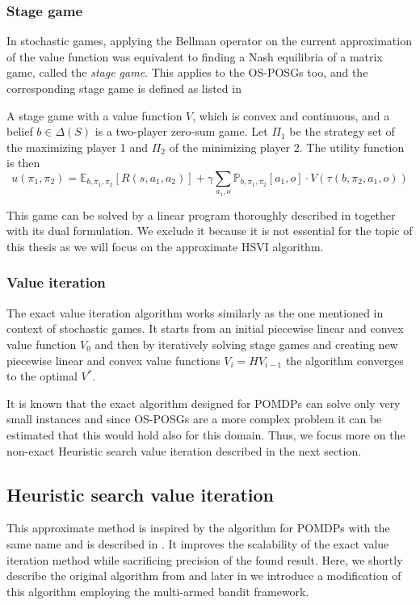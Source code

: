 \documentclass[../main.tex]{subfiles}
\begin{document}
\subsubsection{Stage game}\label{standard:osposg:exact:stage}
In stochastic games, applying the Bellman operator on the current approximation of the value function was equivalent to finding a Nash equilibria of a matrix game, called the \textit{stage game}.
This applies to the OS-POSGs too, and the corresponding stage game is defined as listed in 
\begin{definition}
    A stage game with a value function $V$, which is convex and continuous, and a belief $b \in \Delta(S)$ is a two-player zero-sum game.
    Let $\Pi_1$ be the strategy set of the maximizing player 1 and $\Pi_2$ of the minimizing player 2.
    The utility function is then
    \begin{equation}
        u(\pi_1, \pi_2) = \mathbb{E}_{b, \pi_1, \pi_2}\left[R(s, a_1, a_2)\right] + \gamma\sum_{a_1, o}\mathbb{P}_{b, \pi_1, \pi_2}[a_1, o] \cdot V(\tau(b, \pi_2, a_1, o))
    \end{equation}
\end{definition}
This game can be solved by a linear program thoroughly described in \cite{poposgsthesis} together with its dual formulation.
We exclude it because it is not essential for the topic of this thesis as we will focus on the approximate HSVI algorithm.

\subsubsection{Value iteration}\label{standard:osposg:exact:valit}
The exact value iteration algorithm works similarly as the one mentioned in context of stochastic games.
It starts from an initial piecewise linear and convex value function $V_0$ and then by iteratively solving stage games and creating new piecewise linear and convex value functions $V_i = HV_{i-1}$ the algorithm converges to the optimal $V^*$.

It is known that the exact algorithm designed for POMDPs can solve only very small instances and since OS-POSGs are a more complex problem it can be estimated that this would hold also for this domain.
Thus, we focus more on the non-exact Heuristic search value iteration described in the next section.

\subsection{Heuristic search value iteration}\label{standard:osposg:hsvi}
This approximate method is inspired by the algorithm for POMDPs with the same name and is described in \cite{osposgs}.
It improves the scalability of the exact value iteration method while sacrificing precision of the found result.
Here, we shortly describe the original algorithm from \cite{osposgs} and later in  we introduce a modification of this algorithm employing the multi-armed bandit framework.
\end{document}
